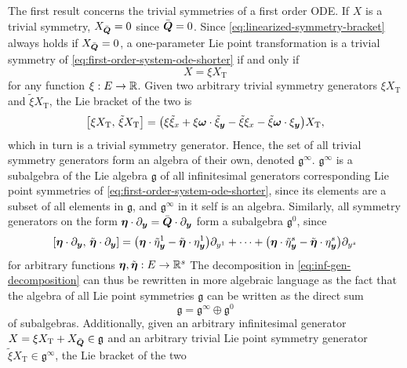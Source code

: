 The first result concerns the trivial symmetries of a first order ODE.
If \(X\) is a trivial symmetry, \(X_{\bar{\boldsymbol{Q}}} = 0\) since \(\bar{\boldsymbol{Q}} = 0\).
Since \cref{eq:linearized-symmetry-bracket} always holds if \(X_{\bar{\boldsymbol{Q}}} = 0\), a one-parameter Lie point transformation is a trivial symmetry of \cref{eq:first-order-system-ode-shorter} if and only if
\begin{equation*}
  X = \xi X_{\text{T}}
\end{equation*}
for any function \(\xi: E \to \mathbb{R}\).
Given two arbitrary trivial symmetry generators \(\xi X_{\text{T}}\) and \(\tilde{\xi} X_{\text{T}}\), the Lie bracket of the two is
\begin{equation*}
  \comm{\xi X_{\text{T}}}{\tilde{\xi} X_{\text{T}}} = \left(\xi \tilde{\xi}_x + \xi \vect{\omega} \cdot \tilde{\xi}_{\vect{y}} - \tilde{\xi} \xi_x - \tilde{\xi} \vect{\omega} \cdot \xi_{\vect{y}} \right) X_{\text{T}},
\end{equation*}
which in turn is a trivial symmetry generator.
Hence, the set of all trivial symmetry generators form an algebra of their own, denoted \(\mathfrak{g}^\infty\).
\(\mathfrak{g}^\infty\) is a subalgebra of the Lie algebra \(\mathfrak{g}\) of all infinitesimal generators corresponding Lie point symmetries of \cref{eq:first-order-system-ode-shorter}, since its elements are a subset of all elements in \(\mathfrak{g}\), and \(\mathfrak{g}^\infty\) in it self is an algebra.
Similarly, all symmetry generators on the form \(\boldsymbol{\eta} \cdot \partial_{\boldsymbol{y}} = \bar{\boldsymbol{Q}} \cdot \partial_{\boldsymbol{y}}\) form a subalgebra \(\mathfrak{g}^0\), since
\begin{equation*}
  \comm{\vect{\eta} \cdot \partial_{\vect{y}}}{\tilde{\vect{\eta}} \cdot \partial_{\vect{y}}} = \left(\vect{\eta} \cdot \tilde{\eta}^1_{\vect{y}} - \tilde{\vect{\eta}} \cdot \eta^1_{\vect{y}}\right) \partial_{y^1} + \dots + \left(\vect{\eta} \cdot \tilde{\eta}^s_{\vect{y}} - \tilde{\vect{\eta}} \cdot \eta^s_{\vect{y}}\right) \partial_{y^s}
\end{equation*}
for arbitrary functions \(\boldsymbol{\eta}, \tilde{\boldsymbol{\eta}}: E \to \mathbb{R}^s\)
The decomposition in \cref{eq:inf-gen-decomposition} can thus be rewritten in more algebraic language as the fact that the algebra of all Lie point symmetries \(\mathfrak{g}\) can be written as the direct sum
\begin{equation*}
  \mathfrak{g} = \mathfrak{g}^\infty \oplus \mathfrak{g}^0
\end{equation*}
of subalgebras.
Additionally, given an arbitrary infinitesimal generator \(X = \xi X_{\text{T}} + X_{\bar{\boldsymbol{Q}}} \in \mathfrak{g}\) and an arbitrary trivial Lie point symmetry generator \(\tilde{\xi} X_{\text{T}} \in \mathfrak{g}^\infty\), the Lie bracket of the two
